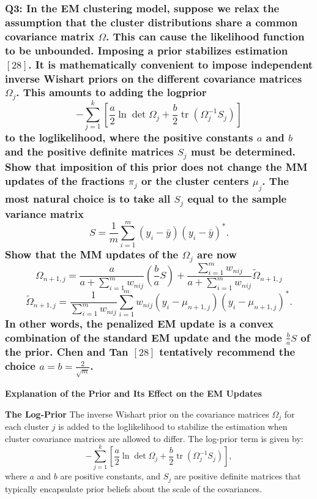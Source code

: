 \documentclass[8pt]{article}
\begin{document}
\subsubsection*{Q3: In the EM clustering model, suppose we relax the assumption that the cluster distributions share a common covariance matrix \(\Omega\). This can cause the likelihood function to be unbounded. Imposing a prior stabilizes estimation \([28]\). It is mathematically convenient to impose independent inverse Wishart priors on the different covariance matrices \(\Omega_j\). This amounts to adding the logprior
\[
- \sum_{j=1}^{k} \left[ \frac{a}{2} \ln \det \Omega_j + \frac{b}{2} \operatorname{tr}(\Omega_j^{-1} S_j) \right]
\]
to the loglikelihood, where the positive constants \(a\) and \(b\) and the positive definite matrices \(S_j\) must be determined. Show that imposition of this prior does not change the MM updates of the fractions \(\pi_j\) or the cluster centers \(\mu_j\). The most natural choice is to take all \(S_j\) equal to the sample variance matrix
\[
S = \frac{1}{m} \sum_{i=1}^{m} (y_i - \bar{y})(y_i - \bar{y})^*.
\]
Show that the MM updates of the \(\Omega_j\) are now
\[
\Omega_{n+1,j} = \frac{a}{a + \sum_{i=1}^{m} w_{nij}} \left( \frac{b}{a} S \right) + \frac{\sum_{i=1}^{m} w_{nij}}{a + \sum_{i=1}^{m} w_{nij}} \tilde{\Omega}_{n+1,j}
\]
\[
\tilde{\Omega}_{n+1,j} = \frac{1}{\sum_{i=1}^{m} w_{nij}} \sum_{i=1}^{m} w_{nij} (y_i - \mu_{n+1,j})(y_i - \mu_{n+1,j})^*.
\]
In other words, the penalized EM update is a convex combination of the standard EM update and the mode \(\frac{b}{a} S\) of the prior. Chen and Tan \([28]\) tentatively recommend the choice \(a = b = \frac{2}{\sqrt{m}}\).}

\textbf{Explanation of the Prior and Its Effect on the EM Updates}

\textbf{The Log-Prior}
The inverse Wishart prior on the covariance matrices \(\Omega_j\) for each cluster \(j\) is added to the loglikelihood to stabilize the estimation when cluster covariance matrices are allowed to differ. The log-prior term is given by:
\[
- \sum_{j=1}^{k} \left[ \frac{a}{2} \ln \det \Omega_j + \frac{b}{2} \operatorname{tr}(\Omega_j^{-1} S_j) \right],
\]
where \(a\) and \(b\) are positive constants, and \(S_j\) are positive definite matrices that typically encapsulate prior beliefs about the scale of the covariances.
\end{document}
